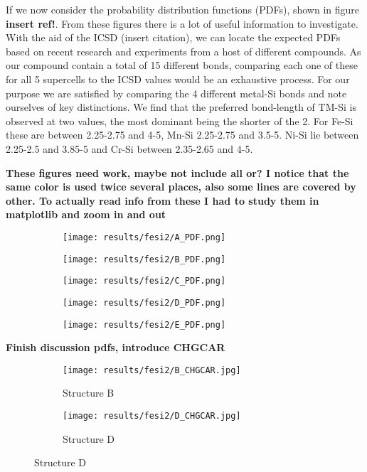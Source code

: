 If we now consider the probability distribution functions (PDFs), shown in figure \textbf{insert ref!}. From these figures there is a lot of useful information to investigate. With the aid of the ICSD (insert citation), we can locate the expected PDFs based on recent research and experiments from a host of different compounds. As our compound contain a total of 15 different bonds, comparing each one of these for all 5 supercells to the ICSD values would be an exhaustive process. For our purpose we are satisfied by comparing the 4 different metal-Si bonds and note ourselves of key distinctions. We find that the preferred bond-length of TM-Si is observed at two values, the most dominant being the shorter of the 2. For Fe-Si these are between 2.25-2.75 and 4-5, Mn-Si 2.25-2.75 and 3.5-5. Ni-Si lie between 2.25-2.5 and 3.85-5 and Cr-Si between 2.35-2.65 and 4-5. 

\textbf{These figures need work, maybe not include all or? I notice that the same color is used twice several places, also some lines are covered by other. To actually read info from these I had to study them in matplotlib and zoom in and out}
\begin{figure}[H]
\centering
	\begin{subfigure}{\textwidth}
		\texttt{[image: results/fesi2/A\_PDF.png]}
	\end{subfigure}	
	\begin{subfigure}{\textwidth}
		\texttt{[image: results/fesi2/B\_PDF.png]}
	\end{subfigure}
	\begin{subfigure}{\textwidth}
		\texttt{[image: results/fesi2/C\_PDF.png]}
	\end{subfigure}
\end{figure}
\begin{figure}[H]
\centering
	\begin{subfigure}{\textwidth}
		\texttt{[image: results/fesi2/D\_PDF.png]}
	\end{subfigure}
	\begin{subfigure}{\textwidth}
		\texttt{[image: results/fesi2/E\_PDF.png]}
	\end{subfigure}
\end{figure}

\textbf{Finish discussion pdfs, introduce CHGCAR}

\begin{figure}
	\begin{subfigure}{\textwidth}
		\texttt{[image: results/fesi2/B\_CHGCAR.jpg]}
		\caption{Structure B}
	\end{subfigure}
	\hfill
	\begin{subfigure}{\textwidth}
		\texttt{[image: results/fesi2/D\_CHGCAR.jpg]}
		\caption{Structure D}
	\end{subfigure}
\end{figure}

